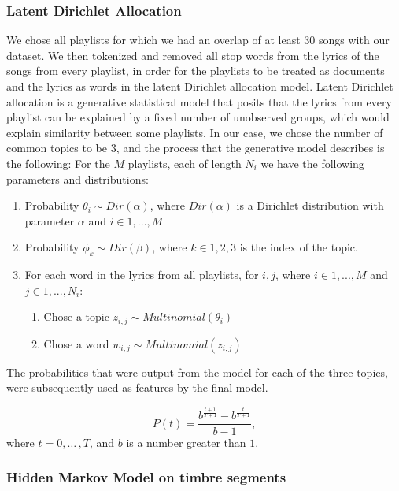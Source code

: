 \documentclass[acmtog]{acmart}
\begin{document}
\subsubsection{Latent Dirichlet Allocation}

We chose all playlists for which we had an overlap of at least 30 songs with our dataset. We then tokenized and removed all stop words from the lyrics of the songs from every playlist, in order for the playlists to be treated as documents and the lyrics as words in the latent Dirichlet allocation model. Latent Dirichlet allocation is a generative statistical model that posits that the lyrics from every playlist can be explained by a fixed number of unobserved groups, which would explain similarity between some playlists. In our case, we chose the number of common topics to be 3, and the process that the generative model describes is the following: \newline
For the $M$ playlists, each of length $N_{i}$ we have the following parameters and distributions:
\begin{enumerate}
  \item Probability $\theta_{i} \sim Dir(\alpha)$, where $Dir(\alpha)$ is a Dirichlet distribution with parameter $\alpha$ and $i \in {1, ..., M}$
  \item Probability $\phi_{k} \sim Dir(\beta)$, where $k \in {1,2,3}$ is the index of the topic.
  \item For each word in the lyrics from all playlists, for $i, j$, where $i \in {1, ..., M}$ and $j \in {1, ..., N_{i}}$:
     \begin{enumerate}
       \item Chose a topic $z_{i, j} \sim Multinomial(\theta_{i})$
       \item Chose a word $w_{i, j} \sim Multinomial(z_{i, j})$
     \end{enumerate}
\end{enumerate}

The probabilities that were output from the model for each of the three topics, were subsequently used as features by the final model.

\begin{equation}
\label{eqn:01}
P(t)=\frac{b^{\frac{t+1}{T+1}}-b^{\frac{t}{T+1}}}{b-1},
\end{equation}
where $t=0,{\ldots}\,,T$, and $b$ is a number greater than $1$.

\subsubsection{Hidden Markov Model on timbre segments}
\end{document}
